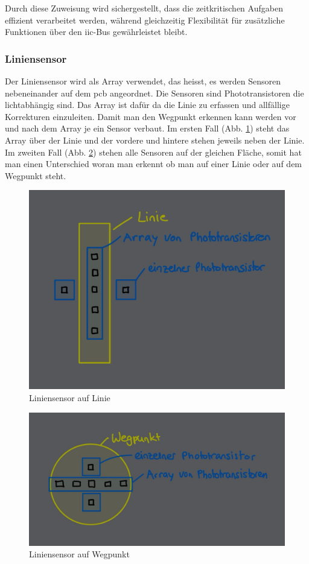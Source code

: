 Durch diese Zuweisung wird sichergestellt, dass die zeitkritischen Aufgaben effizient verarbeitet werden, während gleichzeitig Flexibilität für zusätzliche Funktionen über den \acrshort{iic}-Bus gewährleistet bleibt.


\subsubsection*{Liniensensor}


Der Liniensensor wird als Array verwendet, das heisst, es werden Sensoren nebeneinander auf dem \acrshort{pcb} angeordnet. Die Sensoren sind Phototransistoren die lichtabhängig sind. Das Array ist dafür da die Linie zu erfassen und allfällige Korrekturen einzuleiten. Damit man den Wegpunkt erkennen kann werden vor und nach dem Array je ein Sensor verbaut. Im ersten Fall (Abb. \ref{fig: Liniensensor auf Linie}) steht das Array über der Linie und der vordere und hintere stehen jeweils neben der Linie. Im zweiten Fall (Abb. \ref{fig: Liniensensor auf Wegpunkt}) stehen alle Sensoren auf der gleichen Fläche, somit hat man einen Unterschied woran man erkennt ob man auf einer Linie oder auf dem Wegpunkt steht.


\begin{figure}[H]
    \centering
    \includegraphics[width=0.8\linewidth]{img/Liniensensor_Linie.jpeg}
    \caption{Liniensensor auf Linie}
    \label{fig: Liniensensor auf Linie}
\end{figure}


\begin{figure}[H]
    \centering
    \includegraphics[width=0.8\linewidth]{img/Liniensensor_Wegpunkt.jpeg}
    \caption{Liniensensor auf Wegpunkt}
    \label{fig: Liniensensor auf Wegpunkt}
\end{figure}





